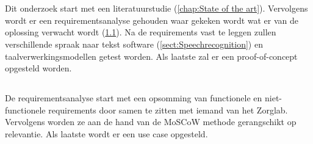 
\chapter{}%
\label{ch:methodologie}



Dit onderzoek start met een literatuurstudie (\ref{chap:State of the art}). Vervolgens wordt er een requirementsanalyse gehouden waar gekeken wordt wat er van de oplossing verwacht wordt (\ref{sect:Requirements analysis}). Na de requirements vast te leggen zullen verschillende spraak naar tekst software (\ref{sect:Speechrecognition}) en taalverwerkingsmodellen getest worden. Als laatste zal er een proof-of-concept opgesteld worden.

\section{} \label{sect:Requirements analysis}%

De requirementsanalyse start met een opsomming van functionele en niet-functionele requirements door samen te zitten met iemand van het Zorglab. Vervolgens worden ze aan de hand van de MoSCoW methode gerangschikt op relevantie. Als laatste wordt er een use case opgesteld.

\subsection{}

